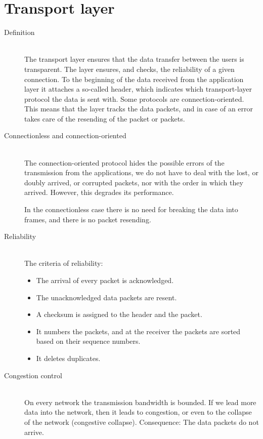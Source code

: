 \documentclass[margin=0px]{article}
\begin{document}
\section{Transport layer}
\begin{description}
    \item[Definition] \hfill \\
        The transport layer ensures that the data transfer between the users is transparent. The layer ensures, and checks, the reliability of a given connection. To the beginning of the data received from the application layer it attaches a so-called header, which indicates which transport-layer protocol the data is sent with. Some protocols are connection-oriented. This means that the layer tracks the data packets, and in case of an error takes care of the resending of the packet or packets.

    \item[Connectionless and connection-oriented] \hfill \\
        The connection-oriented protocol hides the possible errors of the transmission from the applications, we do not have to deal with the lost, or doubly arrived, or corrupted packets, nor with the order in which they arrived. However, this degrades its performance.

        In the connectionless case there is no need for breaking the data into frames, and there is no packet resending.
    \item[Reliability] \hfill \\
        The criteria of reliability:
        \begin{itemize}
            \item The arrival of every packet is acknowledged.
            \item The unacknowledged data packets are resent.
            \item A checksum is assigned to the header and the packet.
            \item It numbers the packets, and at the receiver the packets are sorted based on their sequence numbers.
            \item It deletes duplicates.
        \end{itemize}
    \item[Congestion control] \hfill \\
        On every network the transmission bandwidth is bounded. If we lead more data into the network, then it leads to congestion, or even to the collapse of the network (congestive collapse). Consequence: The data packets do not arrive.


\end{description}
\end{document}

